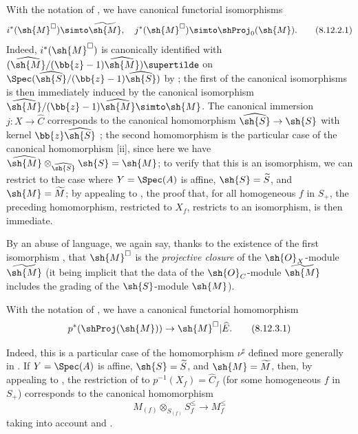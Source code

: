 \begin{proposition}[8.12.2]
\label{II.8.12.2}
With the notation of , we have canonical functorial isomorphisms
\[
\label{II.8.12.2.1}
    i^*(\sh{M}^\square)\simto\widetilde{\sh{M}},
    \quad
    j^*(\sh{M}^\square)\simto\shProj_0(\sh{M}).
\tag{8.12.2.1}
\]
Indeed, $i^*(\sh{M}^\square)$ is canonically identified with $(\widehat{\sh{M}}/(\bb{z}-1)\widehat{\sh{M}})\supertilde$ on $\Spec(\widehat{\sh{S}}/(\bb{z}-1)\widehat{\sh{S}})$ by ;
the first of the canonical isomorphisms  is then immediately induced  by the canonical isomorphism $\widehat{\sh{M}}/(\bb{z}-1)\widehat{\sh{M}}\simto\sh{M}$.
The canonical immersion $j:X\to\widehat{C}$ corresponds to the canonical homomorphism $\widehat{\sh{S}}\to\sh{S}$ with kernel $\bb{z}\widehat{\sh{S}}$ ;
the second homomorphism  is the particular case of the canonical homomorphism [ii], since here we have $\widehat{\sh{M}}\otimes_{\widehat{\sh{S}}}\sh{S}=\sh{M}$;
to verify that this is an isomorphism, we can restrict to the case where $Y=\Spec(A)$ is affine, $\sh{S}=\widetilde{S}$, and $\sh{M}=\widetilde{M}$;
by appealing to , the proof that, for all homogeneous $f$ in $S_+$, the preceding homomorphism, restricted to $X_f$, restricts to an isomorphism, is then immediate.
\end{proposition}


By an abuse of language, we again say, thanks to the existence of the first isomorphism , that $\sh{M}^\square$ is the \emph{projective closure} of the $\sh{O}_X$-module $\widetilde{\sh{M}}$ (it being implicit that the data of the $\sh{O}_C$-module $\widetilde{\sh{M}}$ includes the grading of the $\sh{S}$-module $\sh{M}$).

\begin{env}[8.12.3]
\label{II.8.12.3}
With the notation of , we have a canonical functorial homomorphism
\[
\label{II.8.12.3.1}
    p^*(\shProj(\sh{M}))\to\sh{M}^\square|\widehat{E}.
\tag{8.12.3.1}
\]

Indeed, this is a particular case of the homomorphism $\nu^\sharp$ defined more generally in .
If $Y=\Spec(A)$ is affine, $\sh{S}=\widetilde{S}$, and $\sh{M}=\widetilde{M}$, then, by appealing to , the restriction of  to $p^{-1}(X_f)=\widehat{C}_f$ (for some homogeneous $f$ in $S_+$) corresponds to the canonical homomorphism
\[
\label{II.8.12.3.2}
    M_{(f)}\otimes_{S_{(f)}}S_f^\leq \to M_f^\leq
\tag{8.12.3.2}
\]
taking into account  and .
\end{env}


